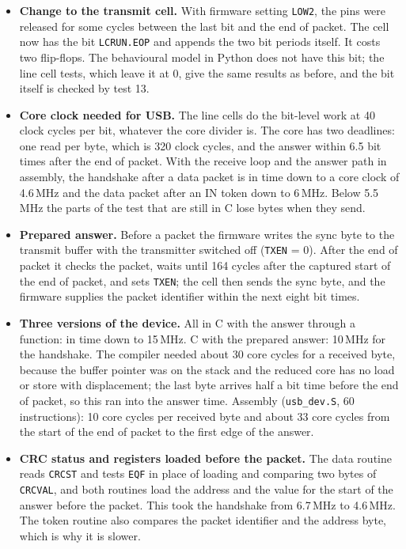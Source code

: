 \documentclass[10pt,a4paper]{article}
\newcommand{\reg}[1]{\texttt{#1}}
\begin{document}
\begin{itemize}
\item \textbf{Change to the transmit cell.} With firmware setting \reg{LOW2}, the pins were released for some cycles
between the last bit and the end of packet. The cell now has the bit \reg{LCRUN.EOP} and appends the two bit
periods itself. It costs two flip-flops. The behavioural model in Python does not have this bit; the line cell
tests, which leave it at 0, give the same results as before, and the bit itself is checked by test 13.
\item \textbf{Core clock needed for USB.} The line cells do the bit-level work at 40 clock cycles per bit, whatever
the core divider is. The core has two deadlines: one read per byte, which is 320 clock cycles, and the answer
within 6.5 bit times after the end of packet. With the receive loop and the answer path in assembly, the
handshake after a data packet is in time down to a core clock of 4.6\,MHz and the data packet after an IN
token down to 6\,MHz. Below 5.5\,MHz the parts of the test that are still in C lose bytes when they send.
\item \textbf{Prepared answer.} Before a packet the firmware writes the sync byte to the transmit buffer
with the transmitter switched off (\reg{TXEN} = 0). After the end of packet it checks the packet, waits until
164 cycles after the captured start of the end of packet, and sets \reg{TXEN}; the cell then
sends the sync byte, and the firmware supplies the packet identifier within the next eight bit times.
\item \textbf{Three versions of the device.} All in C with the answer through a function: in time down to
15\,MHz. C with the prepared answer: 10\,MHz for the handshake. The compiler needed about 30 core cycles for a
received byte, because the buffer pointer was on the stack and the reduced core has no load or store with
displacement; the last byte arrives half a bit time before the end of packet, so this ran into the answer
time. Assembly (\texttt{usb\_dev.S}, 60 instructions): 10 core cycles per received byte and about 33 core
cycles from the start of the end of packet to the first edge of the answer.
\item \textbf{CRC status and registers loaded before the packet.} The data routine reads \reg{CRCST} and tests
\reg{EQF} in place of loading and comparing two bytes of \reg{CRCVAL}, and both routines load the address and
the value for the start of the answer before the packet. This took the handshake from 6.7\,MHz to 4.6\,MHz.
The token routine also compares the packet identifier and the address byte, which is why it is slower.

\end{itemize}
\end{document}
